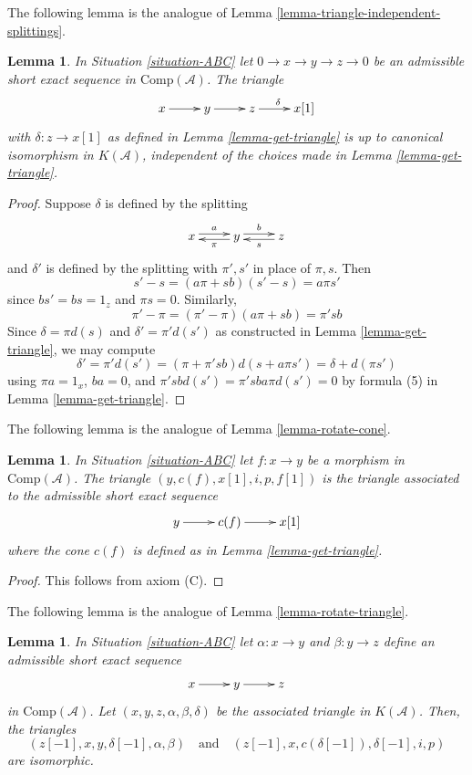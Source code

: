 \documentclass{stacks-project}
\theoremstyle{plain}
\newtheorem{lemma}[subsection]{Lemma}
\theoremstyle{definition}
\theoremstyle{remark}
\numberwithin{equation}{subsection}
\begin{document}
\noindent
The following lemma is the analogue of
Lemma \ref{lemma-triangle-independent-splittings}.

\begin{lemma}
\label{lemma-analogue-triangle-independent-splittings}
In Situation \ref{situation-ABC}
let $0 \to x \to y \to z \to 0$ be an admissible short
exact sequence in $\text{Comp}(\mathcal{A})$. The triangle
$$
\xymatrix{x\ar[r] & y\ar[r] & z\ar[r]^{\delta} & x[1]}
$$
with $\delta : z \to x[1]$ as defined in Lemma \ref{lemma-get-triangle}
is up to canonical isomorphism in $K(\mathcal{A})$, independent of the
choices made in Lemma \ref{lemma-get-triangle}.
\end{lemma}

\begin{proof}
Suppose $\delta$ is defined by the splitting
$$
\xymatrix{
x \ar@<0.5ex>[r]^{a} &
y \ar@<0.5ex>[r]^b\ar@<0.5ex>[l]^{\pi} &
z \ar@<0.5ex>[l]^s
}
$$
and $\delta'$ is defined by the splitting with $\pi',s'$
in place of $\pi,s$. Then
$$
s'-s = (a\pi + sb)(s'-s) = a\pi s'
$$
since $bs' = bs = 1_z$ and $\pi s = 0$. Similarly,
$$
\pi' - \pi = (\pi' - \pi)(a\pi + sb) = \pi'sb
$$
Since $\delta = \pi d(s)$ and $\delta' = \pi'd(s')$
as constructed in Lemma \ref{lemma-get-triangle}, we may compute
$$
\delta' = \pi'd(s') = (\pi + \pi'sb)d(s + a\pi s') = \delta + d(\pi s')
$$
using $\pi a = 1_x$, $ba = 0$, and $\pi'sbd(s') = \pi'sba\pi d(s') = 0$
by formula (5) in Lemma \ref{lemma-get-triangle}.
\end{proof}

\noindent
The following lemma is the analogue of Lemma \ref{lemma-rotate-cone}.

\begin{lemma}
\label{lemma-restate-axiom-c}
In Situation \ref{situation-ABC}
let $f: x \to y$ be a morphism in $\text{Comp}(\mathcal{A})$.
The triangle $(y, c(f), x[1], i, p, f[1])$ is the triangle associated
to the admissible short exact sequence 
$$
\xymatrix{y\ar[r] & c(f) \ar[r] & x[1]}
$$
where the cone $c(f)$ is defined as in Lemma \ref{lemma-get-triangle}.
\end{lemma}

\begin{proof}
This follows from axiom (C).
\end{proof}

\noindent
The following lemma is the analogue of Lemma \ref{lemma-rotate-triangle}.

\begin{lemma}
\label{lemma-cone-rotate-isom}
In Situation \ref{situation-ABC} let $\alpha : x \to y$ and $\beta : y \to z$
define an admissible short exact sequence
$$
\xymatrix{
x \ar[r] &
y\ar[r] &
z
}
$$
in $\text{Comp}(\mathcal{A})$. Let $(x, y, z, \alpha, \beta, \delta)$
be the associated triangle in $K(\mathcal{A})$. Then, the triangles
$$
(z[-1], x, y, \delta[-1], \alpha, \beta)
\quad\text{and}\quad
(z[-1], x, c(\delta[-1]), \delta[-1], i, p)
$$
are isomorphic. 
\end{lemma}
\end{document}

